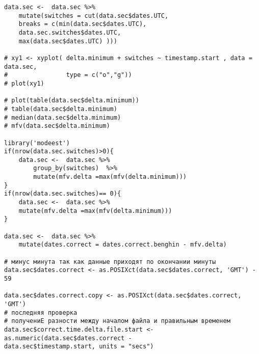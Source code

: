 \begin{lstlisting}[language={Renhanced}, ]
data.sec <-  data.sec %>%
	mutate(switches = cut(data.sec$dates.UTC, 
	breaks = c(min(data.sec$dates.UTC),
	data.sec.switches$dates.UTC,
	max(data.sec$dates.UTC) )))

# xy1 <- xyplot( delta.minimum + switches ~ timestamp.start , data = data.sec,
#                type = c("o","g"))
# plot(xy1)

# plot(table(data.sec$delta.minimum))
# table(data.sec$delta.minimum)
# median(data.sec$delta.minimum)
# mfv(data.sec$delta.minimum)

library('modeest')
if(nrow(data.sec.switches)>0){
	data.sec <-  data.sec %>%
		group_by(switches)  %>%
		mutate(mfv.delta =max(mfv(delta.minimum)))
}
if(nrow(data.sec.switches)== 0){
	data.sec <-  data.sec %>%
	mutate(mfv.delta =max(mfv(delta.minimum)))
}

data.sec <-  data.sec %>%
	mutate(dates.correct = dates.correct.benghin - mfv.delta)

# минус минута так как данные приходят по окончании минуты
data.sec$dates.correct <- as.POSIXct(data.sec$dates.correct, 'GMT') - 59

data.sec$dates.correct.copy <- as.POSIXct(data.sec$dates.correct, 'GMT')
# последняя проверка
# получениЕ разности между началом файла и правильным временем
data.sec$correct.time.delta.file.start <- as.numeric(data.sec$dates.correct - 
data.sec$timestamp.start, units = "secs")
\end{lstlisting}

%
%
%
%
%





